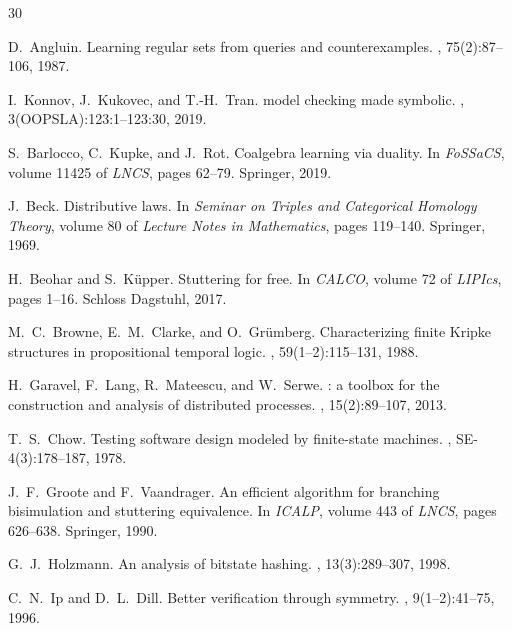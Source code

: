 \documentclass[11pt]{article}
\begin{document}
\begin{thebibliography}{30}

D.~Angluin.
\newblock Learning regular sets from queries and counterexamples.
, 75(2):87--106, 1987.

I.~Konnov, J.~Kukovec, and T.-H.~Tran.
 model checking made symbolic.
, 3(OOPSLA):123:1--123:30, 2019.

S.~Barlocco, C.~Kupke, and J.~Rot.
\newblock Coalgebra learning via duality.
\newblock In {\em FoSSaCS}, volume 11425 of {\em LNCS}, pages 62--79.
  Springer, 2019.

J.~Beck.
\newblock Distributive laws.
\newblock In {\em Seminar on Triples and Categorical Homology Theory},
  volume 80 of {\em Lecture Notes in Mathematics}, pages 119--140. Springer,
  1969.

H.~Beohar and S.~K{\"u}pper.
\newblock Stuttering for free.
\newblock In {\em CALCO}, volume 72 of {\em LIPIcs}, pages 1--16. Schloss
  Dagstuhl, 2017.

M.~C.~Browne, E.~M.~Clarke, and O.~Gr{\"u}mberg.
\newblock Characterizing finite {K}ripke structures in propositional temporal
  logic.
, 59(1--2):115--131, 1988.

H.~Garavel, F.~Lang, R.~Mateescu, and W.~Serwe.
: a toolbox for the construction and analysis of
  distributed processes.
,
  15(2):89--107, 2013.

T.~S.~Chow.
\newblock Testing software design modeled by finite-state machines.
, SE-4(3):178--187, 1978.

J.~F.~Groote and F.~Vaandrager.
\newblock An efficient algorithm for branching bisimulation and stuttering
  equivalence.
\newblock In {\em ICALP}, volume 443 of {\em LNCS}, pages 626--638. Springer,
  1990.

G.~J.~Holzmann.
\newblock An analysis of bitstate hashing.
, 13(3):289--307, 1998.

C.~N.~Ip and D.~L.~Dill.
\newblock Better verification through symmetry.
, 9(1--2):41--75, 1996.


\end{thebibliography}
\end{document}
